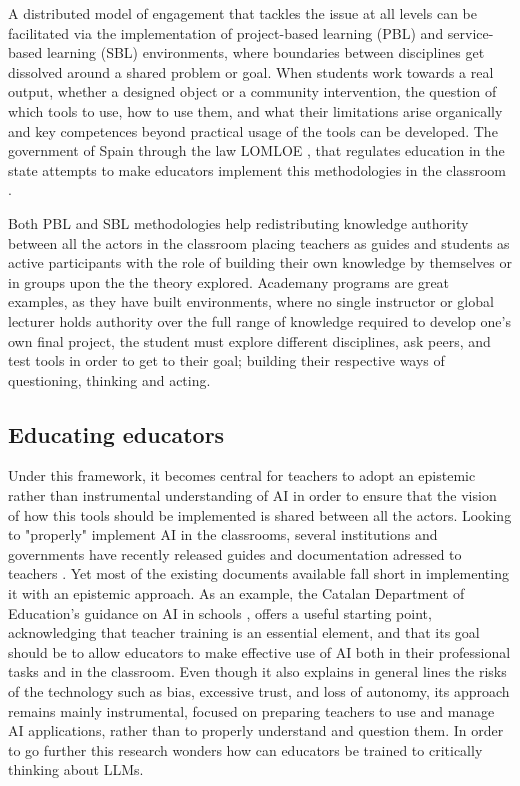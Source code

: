 \documentclass{article}
\begin{document}
A distributed model of engagement that tackles the issue at all levels can be facilitated via the implementation of project-based learning (PBL) and service-based learning (SBL) environments, where boundaries between disciplines get dissolved around a shared problem or goal. When students work towards a real output, whether a designed object or a community intervention, the question of which tools to use, how to use them, and what their limitations arise organically and key competences beyond practical usage of the tools can be developed. The government of Spain through the law LOMLOE \cite{lomloe2020}, that regulates education in the state attempts to make educators implement this methodologies in the classroom \cite{mefpd_aps}.

Both PBL and SBL methodologies help redistributing knowledge authority between all the actors in the classroom placing teachers as guides and students as active participants with the role of building their own knowledge by themselves or in groups upon the the theory explored. Academany \cite{academany} programs are great examples, as they have built environments, where no single instructor or global lecturer holds authority over the full range of knowledge required to develop one's own final project, the student must explore different disciplines, ask peers, and test tools in order to get to their goal; building their respective ways of questioning, thinking and acting.

\subsection{Educating educators}

Under this framework, it becomes central for teachers to adopt an epistemic rather than instrumental understanding of AI in order to ensure that the vision of how this tools should be implemented is shared between all the actors. Looking to "properly" implement AI in the classrooms, several institutions and governments have recently released guides and documentation adressed to teachers \cite{intef2024guia}\cite{gencat2024ia}\cite{juntaandalucia2024ia}. Yet most of the existing documents available fall short in implementing it with an epistemic approach. As an example, the Catalan Department of Education's guidance on AI in schools \cite{gencat2024ia}, offers a useful starting point, acknowledging that teacher training is an essential element, and that its goal should be to allow educators to make effective use of AI both in their professional tasks and in the classroom. Even though it also explains in general lines the risks of the technology such as bias, excessive trust, and loss of autonomy, its approach remains mainly instrumental, focused on preparing teachers to use and manage AI applications, rather than to properly understand and question them. In order to go further this research wonders how can educators be trained to critically thinking about LLMs.
\end{document}

